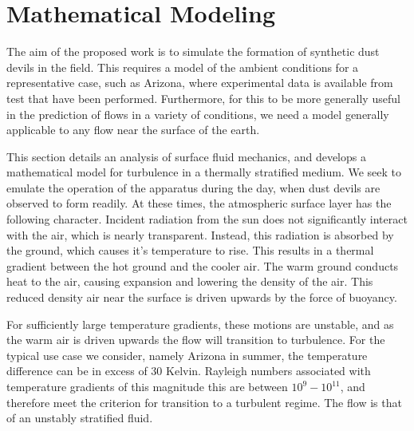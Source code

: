 \section{Mathematical Modeling}
\label{sec:mathmodel}


%
%

The aim of the proposed work is to simulate the formation of synthetic
dust devils in the field. This requires a model of the ambient conditions for a
representative case, such as Arizona, where experimental data is
available from test that have been performed. Furthermore, for this to be
more generally useful in the prediction of flows in a variety of
conditions, we need a model generally applicable to any flow near the
surface of the earth.  

This section details an analysis of surface fluid mechanics, and
develops a mathematical model for turbulence in a thermally stratified
medium. We seek to emulate the operation of the apparatus during the day, 
when dust devils are observed to form readily. 
At these times, the atmospheric surface layer has the following character. 
Incident radiation from the sun does not significantly interact with the
air, which is nearly transparent. Instead, this radiation is absorbed by
the ground, which causes it's temperature to rise. This results in a thermal
gradient between the hot ground and the cooler air. The warm ground
conducts heat to the air, causing expansion and lowering the density
of the air. This reduced density air near the surface is driven upwards
by the force of buoyancy.  

For sufficiently large temperature gradients, these motions are
unstable, and as the warm air is driven upwards the flow will transition
to turbulence. For the typical use case we consider, namely Arizona in
summer, the temperature difference can be in excess of 30 Kelvin. 
Rayleigh numbers associated with temperature gradients of this magnitude
this are between $10^{9} - 10^{11}$, and therefore meet the criterion
for transition to a turbulent regime. The flow is that of an unstably
stratified fluid.  

